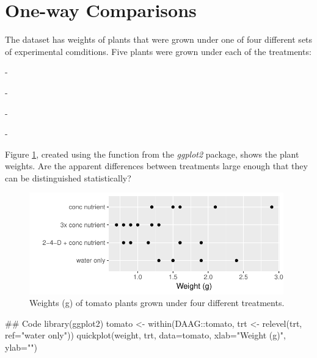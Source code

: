 \section{One-way Comparisons}

The dataset  has weights of plants that were grown
under one of four different sets of experimental comditions.
Five plants were grown under each of the treatments:
\begin{itemizz}
  \item[-] 
  \item[-] 
  \item[-] 
  \item[-] 
\end{itemizz}
Figure \ref{fig:Tomato}, created
using the function  from the {\em ggplot2} package,
shows the plant weights.  Are the apparent differences between
treatments large enough that they can be distinguished statistically?

\begin{figure}
\vspace*{-6pt}
\begin{Schunk}


\centerline{\includegraphics[width=0.98\textwidth]{figs/03-gg-tomato-1} }

\end{Schunk}
\caption{Weights (g) of tomato plants grown under four different
  treatments.\label{fig:Tomato}}
\end{figure}

\begin{Schunk}
\begin{Sinput}
## Code
library(ggplot2)
tomato <- within(DAAG::tomato, 
                 trt <- relevel(trt, ref="water only"))
quickplot(weight, trt, data=tomato,
          xlab="Weight (g)", ylab="")
\end{Sinput}
\end{Schunk}

